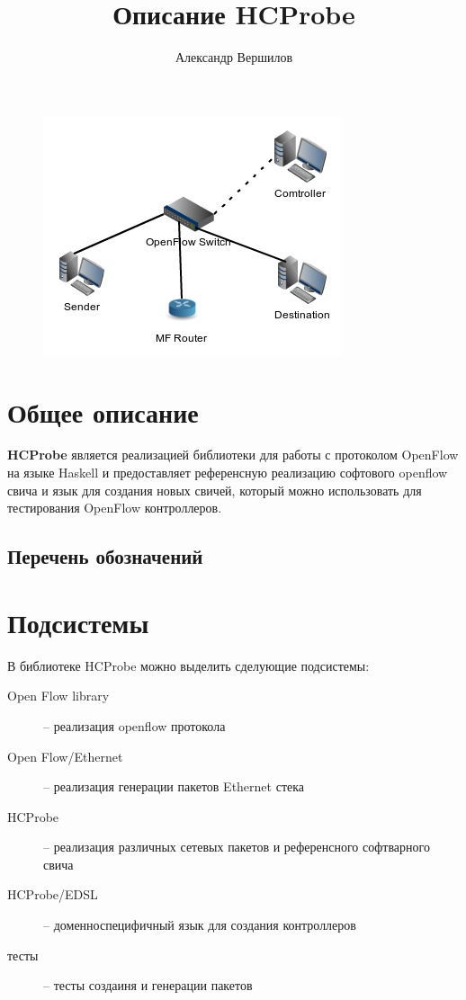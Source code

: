 \documentclass[9pt,a4paper]{article}
\title{Описание HCProbe}
\author{Александр Вершилов}
\begin{document}
\maketitle
\begin{figure}[!h]
   \centering 
   \includegraphics[width=0.3\columnwidth]{images/testcfg2.png}
\end{figure}                                                        

\tableofcontents

\pagebreak

\section{Общее описание}

\textbf{HCProbe} является реализацией библиотеки для работы с протоколом
OpenFlow на языке Haskell и предоставляет референсную реализацию софтового
openflow свича и язык для создания новых свичей, который можно использовать
для тестирования OpenFlow контроллеров.

\subsection{Перечень обозначений}

\pagebreak

\section{Подсистемы}

В библиотеке HCProbe можно выделить сделующие подсистемы:
\begin{description}
    \item[Open Flow library]  -- реализация openflow протокола
    \item[Open Flow/Ethernet] -- реализация генерации пакетов Ethernet стека
    \item[HCProbe]            -- реализация различных сетевых пакетов и референсного софтварного свича
    \item[HCProbe/EDSL]       -- доменноспецифичный язык для создания контроллеров
    \item[тесты]              -- тесты создаиня и генерации пакетов
\end{description}
\end{document}
